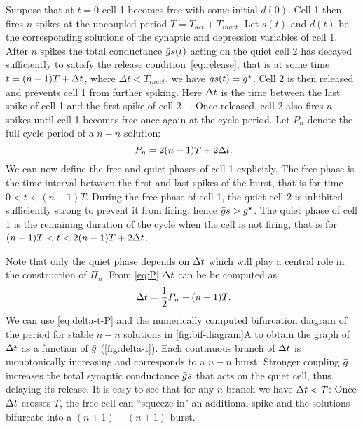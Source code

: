 \documentclass[../manuscript.tex]{subfiles}
\begin{document}
Suppose that at $t=0$ cell 1 becomes free with some initial $d(0)$.
Cell 1 then fires $n$ spikes at the uncoupled period $T=T_{act}+T_{inact}$.
Let $s(t)$ and $d(t)$ be the corresponding solutions of the synaptic and depression variables of cell 1.
After $n$ spikes the total conductance $\bar g s(t)$ acting on the quiet cell 2 has decayed sufficiently to satisfy the release condition~\eqref{eq:release}, that is at some time $t=(n-1)T + \Delta t$, where $\Delta t < T_{inact}$, we have $\bar g s(t)=g^{\star}$.
Cell 2 is then released and prevents cell 1 from further spiking.
Here $\Delta t$ is the time between the last spike of cell 1 and the first spike of cell 2 ~\citep{bose2011}.
Once released, cell 2 also fires $n$ spikes until cell 1 becomes free once again at the cycle period.
Let $P_n$ denote the full cycle period of a $n-n$ solution:
\begin{equation}
  ~\label{eq:P}
  P_n = 2(n-1)T + 2\Delta t.
\end{equation}
We can now define the free and quiet phases of cell 1 explicitly. The free phase is the time interval between the first and last spikes of the burst, that is for time $0<t<(n-1)T$.
During the free phase of cell 1, the quiet cell 2 is inhibited sufficiently strong to prevent it from firing, hence $\bar g s > g^{\star}$.
The quiet phase of cell 1 is the remaining duration of the cycle when the cell is not firing, that is for $(n-1)T < t < 2(n-1)T + 2\Delta t$.

Note that only the quiet phase depends on $\Delta t$ which will play a central role in the construction of $\Pi_{n}$.
From \cref{eq:P} $\Delta t$ can be be computed as
\begin{equation}
  ~\label{eq:delta-t-P}
  \Delta t = \frac{1}{2}P_n - (n-1)T.
\end{equation}
\noindent
We can use \cref{eq:delta-t-P} and the numerically computed bifurcation diagram of the period for stable $n-n$ solutions in \cref{fig:bif-diagram}A to obtain the graph of $\Delta t$ as a function of $\bar g$ (\cref{fig:delta-t}).
Each continuous branch of $\Delta t$ is monotonically increasing and corresponds to a $n-n$ burst:
Stronger coupling $\bar g$ increases the total synaptic conductance $\bar g s$ that acts on the quiet cell, thus delaying its release.
It is easy to see that for any $n$-branch we have $\Delta t<T$:
Once $\Delta t$ crosses $T$, the free cell can ``squeeze in" an additional spike and the solutions bifurcate into a $(n+1)-(n+1)$ burst.
\end{document}
